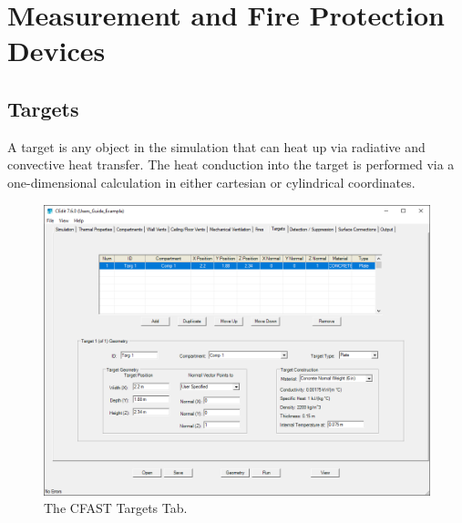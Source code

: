 





\chapter{Measurement and Fire Protection Devices}
\label{info:DEVC}
\section{Targets}
\label{chapter:targets}

A target is any object in the simulation that can heat up via radiative and convective heat transfer. The heat conduction into the target is performed via a one-dimensional calculation in either cartesian or cylindrical coordinates.

\begin{figure}[h!]
\begin{center}
\includegraphics[width=6.5in]{FIGURES/Target_Tab}
\caption[The CFAST Targets Tab]{The CFAST Targets Tab.}
\end{center}
\end{figure}

